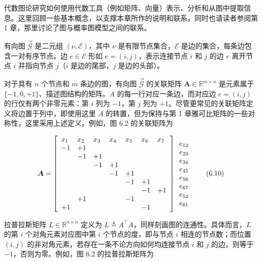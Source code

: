 代数图论研究如何使用代数工具（例如矩阵、向量）表示、分析和从图中提取信息。这里回顾一些基本概念，以支撑本章所作的说明和联系。同时也请读者参阅第 1 章，那里讨论了图与概率图模型之间的联系。

有向图 $\overrightarrow { \mathcal { G } }$ 是二元组 $( \nu , \mathcal { E } )$，其中 $\nu$ 是有限节点集合，$\mathcal { E }$ 是边的集合，每条边包含一对有序节点。边 $e \in { \mathcal { E } }$ 形如 $e = ( i , j )$，表示连接节点 $i$ 和 $j$ 的边 $e$ 离开节点 $i$ 并指向节点 $j$（$i$ 是边的尾部，$j$ 是边的头部）。

对于具有 $n$ 个节点和 $m$ 条边的图，有向图 $\vec { \mathcal { G } }$ 的关联矩阵 $\pmb { A } \in \mathbb { R } ^ { m \times n }$ 是元素属于 $\{ - 1 , 0 , + 1 \}$、描述图结构的矩阵。$A$ 的每一行对应一条边，而对应边 $e = ( i , j )$ 的行仅有两个非零元素：第 $i$ 列为 $-1$，第 $j$ 列为 $+1$。尽管更常见的关联矩阵定义将边置于列中，即使用这里 $A$ 的转置，但为保持与第 1 章雅可比矩阵的一些对称性，这里采用上述定义。例如，图 6.2 的关联矩阵为

\begin{equation}
\boldsymbol {A} = \left[ \begin{array}{l l l l l l l} x _ {1} & x _ {2} & x _ {3} & x _ {4} & x _ {5} & x _ {6} & x _ {7} \\ - 1 & + 1 & & & & & \\ & - 1 & + 1 & & & & \\ & & - 1 & + 1 & & & \\ & & & - 1 & + 1 & & \\ & & & & - 1 & + 1 & \\ & & & & & - 1 & + 1 \\ & + 1 & & & - 1 & & \\ + 1 & & & & & - 1 \end{array} \right] \begin{array}{l} e _ {1 2} \\ e _ {2 3} \\ e _ {3 4} \\ e _ {4 5} \\ e _ {5 6} \\ e _ {6 7} \\ e _ {5 2} \\ e _ {6 1} \end{array}\tag{6.10}
\end{equation}

拉普拉斯矩阵 $L \in \mathbb { R } ^ { n \times n }$ 定义为 $L \triangleq A ^ { \intercal } A$，同样刻画图的连通性。具体而言，$L$ 的第 $i$ 个对角元素对应图中第 $i$ 个节点的度，即与节点 $i$ 相连的节点数；而位置 $( i , j )$ 的非对角元素，若存在一条不论方向如何均连接节点 $i$ 和 $j$ 的边，则等于 $-1$，否则为零。例如，图 6.2 的拉普拉斯矩阵为

